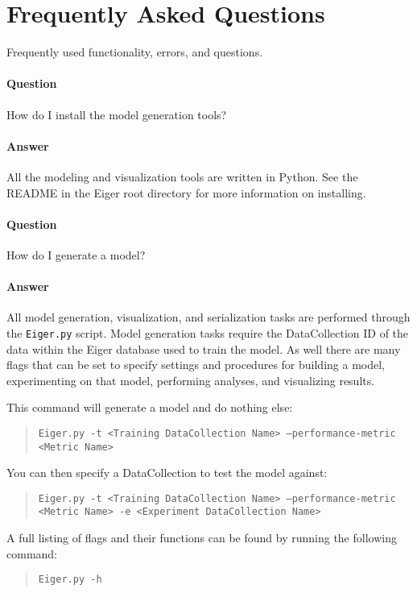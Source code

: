 \section{Frequently Asked Questions}
\label{sec:faq}
Frequently used functionality, errors, and questions.
\paragraph{Question}
How do I install the model generation tools?
\paragraph{Answer}
All the modeling
and visualization tools are written in Python. See the README in the Eiger
root directory for more information on installing. 

\paragraph{Question}
How do I generate a model?
\paragraph{Answer}
All model generation, visualization, and serialization tasks are
performed through the \texttt{Eiger.py} script. Model generation tasks require
the DataCollection ID of the data within the Eiger database used to train
the model. As well there are many flags that can be set to specify
settings and procedures for building a model, experimenting on that model,
performing analyses, and visualizing results. 

This command will generate a model and do nothing else:

	\begin{quote}
	\texttt{Eiger.py -t <Training DataCollection Name> --performance-metric <Metric Name>}
	\end{quote}

You can then specify a DataCollection to test the model against:

	\begin{quote}
	\texttt{Eiger.py -t <Training DataCollection Name> --performance-metric <Metric Name> 
                     -e <Experiment DataCollection Name>}
	\end{quote}

A full listing of flags and their functions can be found by running the
following command:

	\begin{quote}
	\texttt{Eiger.py -h}
	\end{quote}

